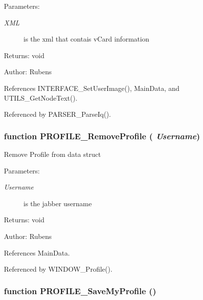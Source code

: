 \begin{Desc}
\item[Parameters:]
\begin{description}
\item[{\em XML}]is the xml that contais vCard information \end{description}
\end{Desc}
\begin{Desc}
\item[Returns:]void \end{Desc}
\begin{Desc}
\item[Author:]Rubens \end{Desc}


References INTERFACE\_\-SetUserImage(), MainData, and UTILS\_\-GetNodeText().

Referenced by PARSER\_\-ParseIq().
\subsubsection{\setlength{\rightskip}{0pt plus 5cm}function PROFILE\_\-RemoveProfile ( {\em Username})}\label{profile_2profile_8js_70701a1a004da0bac2f7336972f00aa1}


Remove Profile from data struct

\begin{Desc}
\item[Parameters:]
\begin{description}
\item[{\em Username}]is the jabber username \end{description}
\end{Desc}
\begin{Desc}
\item[Returns:]void \end{Desc}
\begin{Desc}
\item[Author:]Rubens \end{Desc}


References MainData.

Referenced by WINDOW\_\-Profile().
\subsubsection{\setlength{\rightskip}{0pt plus 5cm}function PROFILE\_\-SaveMyProfile ()}\label{profile_2profile_8js_685d222531076f6d4b69e72299b5c8d9}



